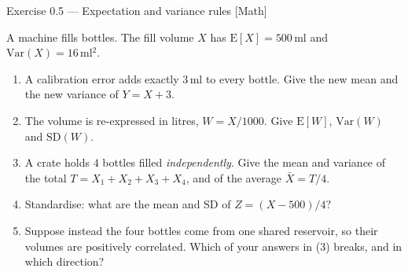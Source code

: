 \documentclass[aspectratio=169,11pt]{beamer}
\begin{document}
\begin{frame}{Exercise 0.5 --- Expectation and variance rules [Math]}
  \begin{exercise}
    A machine fills bottles. The fill volume $X$ has
    $\mathrm{E}[X] = 500$\,ml and $\mathrm{Var}(X) = 16$\,ml$^2$.
    \begin{enumerate}
      \item A calibration error adds exactly $3$\,ml to every bottle. Give the
            new mean and the new variance of $Y = X + 3$.
      \item The volume is re-expressed in litres, $W = X/1000$. Give
            $\mathrm{E}[W]$, $\mathrm{Var}(W)$ and $\mathrm{SD}(W)$.
      \item A crate holds $4$ bottles filled \emph{independently}. Give the
            mean and variance of the total $T = X_1 + X_2 + X_3 + X_4$, and of
            the average $\bar X = T/4$.
      \item Standardise: what are the mean and SD of $Z = (X - 500)/4$?
      \item Suppose instead the four bottles come from one shared reservoir,
            so their volumes are positively correlated. Which of your answers
            in (3) breaks, and in which direction?
    \end{enumerate}
  \end{exercise}
\end{frame}
\end{document}
